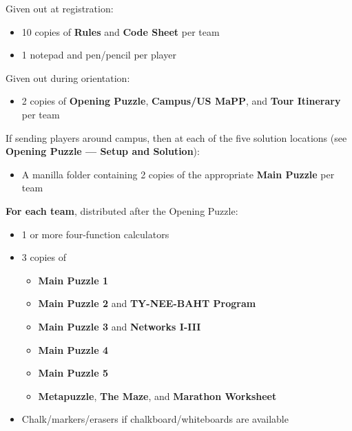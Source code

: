 

\noindent
Given out at registration:

\begin{itemize}
  \item
  10 copies of \textbf{Rules} and \textbf{Code Sheet} per team
  \item
  1 notepad and pen/pencil per player
\end{itemize}


\noindent
Given out during orientation:

\begin{itemize}
  \item
  2 copies of \textbf{Opening Puzzle}, \textbf{Campus/US MaPP}, and
  \textbf{Tour Itinerary} per team
\end{itemize}

\noindent
If sending players around campus, then at each of
the five solution locations
(see \textbf{Opening Puzzle --- Setup and Solution}):

\begin{itemize}
  \item
  A manilla folder containing
  2 copies of the appropriate \textbf{Main Puzzle} per team
\end{itemize}


\textbf{For each team}, distributed after the Opening Puzzle:

\begin{itemize}
\item 1 or more four-function calculators
\item 3 copies of
  \begin{itemize}
    \item \textbf{Main Puzzle 1}
    \item \textbf{Main Puzzle 2} and \textbf{TY-NEE-BAHT Program}
    \item \textbf{Main Puzzle 3} and \textbf{Networks I-III}
    \item \textbf{Main Puzzle 4}
    \item \textbf{Main Puzzle 5}
    \item \textbf{Metapuzzle}, \textbf{The Maze}, and \textbf{Marathon Worksheet}
  \end{itemize}
\item Chalk/markers/erasers if chalkboard/whiteboards are available
\end{itemize}

